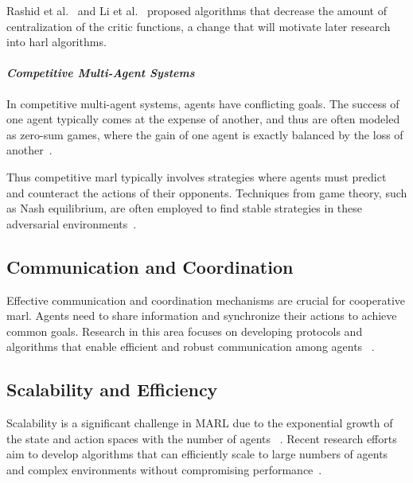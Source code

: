 Rashid et al.~\cite*{rashid2018} and Li et al.~\cite*{li2023d}
proposed algorithms that decrease the amount of centralization 
of the critic functions, a change that will motivate later research
into \gls{harl} algorithms.

    \paragraph*{\emph{Competitive Multi-Agent Systems}} \hfil 

In competitive multi-agent systems, agents have conflicting goals. 
The success of one agent typically comes at the expense of another,
and thus are often modeled as zero-sum games, where the gain of 
one agent is exactly balanced by the loss of another~\cite{leonardos2021}.

Thus competitive \gls{marl} typically involves strategies where agents 
must predict and counteract the actions of their opponents. 
Techniques from game theory, such as Nash equilibrium, are often employed 
to find stable strategies in these adversarial environments~\cite{busoniu2008}.

    \subsection*{Communication and Coordination}

Effective communication and coordination mechanisms are crucial 
for cooperative \gls{marl}. Agents need to share information and 
synchronize their actions to achieve common goals. 
Research in this area focuses on developing protocols and algorithms that 
enable efficient and robust communication among agents~%
\cite{sukhbaatar2016,fotouhi2019,hoang2023}.

    \subsection*{Scalability and Efficiency}

Scalability is a significant challenge in MARL due to the exponential 
growth of the state and action spaces with the number of agents~%
\cite{cao2012,busoniu2008}. 
Recent research efforts aim to develop algorithms that can efficiently 
scale to large numbers of agents and complex environments without 
compromising performance~\cite{smit2023,sun2023}.

